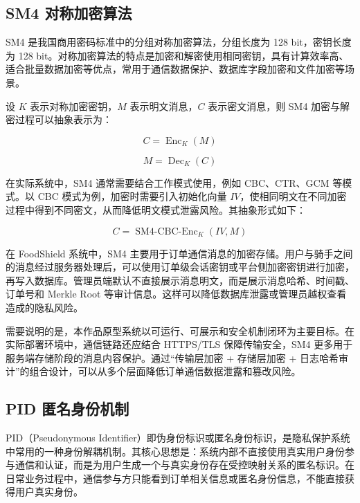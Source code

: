 \documentclass[UTF8,a4paper,zihao=-4,fontset=fandol]{ctexart}
\begin{document}
\subsection{SM4 对称加密算法}

SM4 是我国商用密码标准中的分组对称加密算法，分组长度为 128 bit，密钥长度为 128 bit。对称加密算法的特点是加密和解密使用相同密钥，具有计算效率高、适合批量数据加密等优点，常用于通信数据保护、数据库字段加密和文件加密等场景。

设 $K$ 表示对称加密密钥，$M$ 表示明文消息，$C$ 表示密文消息，则 SM4 加密与解密过程可以抽象表示为：

\begin{equation}
C = \operatorname{Enc}_{K}(M)
\end{equation}

\begin{equation}
M = \operatorname{Dec}_{K}(C)
\end{equation}

在实际系统中，SM4 通常需要结合工作模式使用，例如 CBC、CTR、GCM 等模式。以 CBC 模式为例，加密时需要引入初始化向量 $IV$，使相同明文在不同加密过程中得到不同密文，从而降低明文模式泄露风险。其抽象形式如下：

\begin{equation}
C = \operatorname{SM4\mbox{-}CBC\mbox{-}Enc}_{K}(IV,M)
\end{equation}

在 FoodShield 系统中，SM4 主要用于订单通信消息的加密存储。用户与骑手之间的消息经过服务器处理后，可以使用订单级会话密钥或平台侧加密密钥进行加密，再写入数据库。管理员端默认不直接展示消息明文，而是展示消息哈希、时间戳、订单号和 Merkle Root 等审计信息。这样可以降低数据库泄露或管理员越权查看造成的隐私风险。

需要说明的是，本作品原型系统以可运行、可展示和安全机制闭环为主要目标。在实际部署环境中，通信链路还应结合 HTTPS/TLS 保障传输安全，SM4 更多用于服务端存储阶段的消息内容保护。通过“传输层加密 + 存储层加密 + 日志哈希审计”的组合设计，可以从多个层面降低订单通信数据泄露和篡改风险。

\subsection{PID 匿名身份机制}

PID（Pseudonymous Identifier）即伪身份标识或匿名身份标识，是隐私保护系统中常用的一种身份解耦机制。其核心思想是：系统内部不直接使用真实用户身份参与通信和认证，而是为用户生成一个与真实身份存在受控映射关系的匿名标识。在日常业务过程中，通信参与方只能看到订单相关信息或匿名身份信息，不能直接获得用户真实身份。
\end{document}
